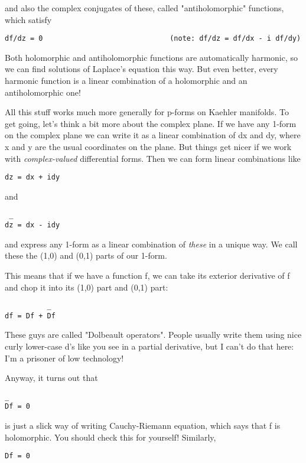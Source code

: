 and also the complex conjugates of these, called "antiholomorphic"
functions, which satisfy

\begin{verbatim}
df/dz = 0                              (note: df/dz = df/dx - i df/dy)
\end{verbatim}
    
Both holomorphic and antiholomorphic functions are automatically harmonic, 
so we can find solutions of Laplace's equation this way.  But even better, 
every harmonic function is a linear combination of a holomorphic and an 
antiholomorphic one!  

All this stuff works much more generally for p-forms on Kaehler
manifolds.  To get going, let's think a bit more about the complex
plane.  If we have any 1-form on the complex plane we can write it as a
linear combination of dx and dy, where x and y are the usual coordinates
on the plane.  But things get nicer if we work with \emph{complex-valued}
differential forms.  Then we can form linear combinations like

\begin{verbatim}
dz = dx + idy
\end{verbatim}
    
and 
\begin{verbatim}
 _
dz = dx - idy
\end{verbatim}
    
and express any 1-form as a linear combination of \emph{these} 
in a unique way.
We call these the (1,0) and (0,1) parts of our 1-form.  

This means that if we have a function f, we can take its exterior
derivative of f and chop it into its (1,0) part and (0,1) part: 
\begin{verbatim}
          _ 
df = Df + Df
\end{verbatim}
    
These guys are called "Dolbeault operators".  People usually
write them using nice curly lower-case d's like you see in a partial
derivative, but I can't do that here: I'm a prisoner of low technology!

Anyway, it turns out that 
\begin{verbatim}
_
Df = 0 
\end{verbatim}
    
is just a slick way of writing Cauchy-Riemann equation, which says that
f is holomorphic.  You should check this for yourself!  Similarly,

\begin{verbatim}
Df = 0 
\end{verbatim}
    
